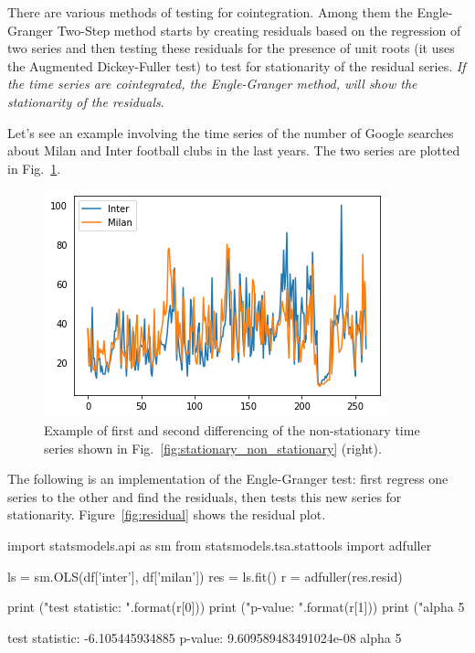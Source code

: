 There are various methods of testing for cointegration. Among them the Engle-Granger Two-Step method starts by creating residuals based on the regression of two series and then testing these residuals for the presence of unit roots (it uses the Augmented Dickey-Fuller test)  to test for stationarity of the residual series. \emph{If the time series are cointegrated, the Engle-Granger method, will show the stationarity of the residuals}.

Let's see an example involving the time series of the number of Google searches about Milan and Inter football clubs in the last years. The two series are plotted in Fig.~\ref{fig:cointegrated_series}.

\begin{figure}[htb]
	\centering
	\includegraphics[width=0.7\linewidth]{figures/cointegrated_series.png}
	\caption{Example of first and second differencing of the non-stationary time series shown in Fig.~\ref{fig:stationary_non_stationary} (right).}
	\label{fig:cointegrated_series}
\end{figure}

The following is an implementation of the Engle-Granger test: first regress one series to the other and find the residuals, then tests this new series for stationarity. Figure~\ref{fig:residual} shows the residual plot.
   
\begin{ipython}
import statsmodels.api as sm
from statsmodels.tsa.stattools import adfuller

ls = sm.OLS(df['inter'], df['milan'])
res = ls.fit()
r = adfuller(res.resid)

print ("test statistic: {}".format(r[0]))
print ("p-value: {}".format(r[1]))
print ("alpha 5%
\end{ipython}
\begin{ioutput}
test statistic: -6.105445934885
p-value: 9.609589483491024e-08
alpha 5%
\end{ioutput}


